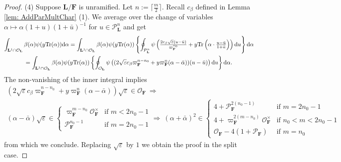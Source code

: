 \documentclass[A4]{amsart}
\numberwithin{equation}{section} \everymath{\displaystyle}
\newcommand{\Tr}{{\rm Tr}}
\newcommand{\ud}{\mathrm{d}}
\newcommand{\F}{\mathbf{F}}
\newcommand{\bL}{\mathbf{L}}
\newcommand{\vO}{\mathcal{O}}
\newcommand{\vP}{\mathcal{P}}
\begin{document}
\begin{proof}
\noindent (4) Suppose $\bL/\F$ is unramified. Let $n := \lceil \tfrac{m}{2} \rceil$. Recall $c_{\beta}$ defined in Lemma \ref{lem: AddParMultChar} (1). We average over the change of variables $\alpha \mapsto \alpha (1+u)(1+\bar{u})^{-1}$ for $u \in \vP_{\bL}^n$ and get
\begin{multline*} 
	\int_{\bL^1 \cap \vO_{\bL}} \beta(\alpha) \psi(y \Tr(\alpha)) \ud \alpha = \int_{\bL^1 \cap \vO_{\bL}} \beta(\alpha) \psi(y \Tr(\alpha)) \left\{ \oint_{\vP_{\bL}^n} \psi \left( \tfrac{2 c_{\beta} \sqrt{\varepsilon} (u-\bar{u})}{\varpi_{\F}^{n_0}} +y \Tr \left( \alpha \cdot \tfrac{u-\bar{u}}{1+\bar{u}} \right) \right) \ud u \right\} \ud \alpha \\
	= \int_{\bL^1 \cap \vO_{\bL}} \beta(\alpha) \psi(y \Tr(\alpha)) \left\{ \oint_{\vO_{\bL}} \psi \left( (2 \sqrt{\varepsilon} c_{\beta} \varpi_{\F}^{n-n_0} + y \varpi_{\F}^n (\alpha - \bar{\alpha}))(u-\bar{u}) \right) \ud u \right\} \ud \alpha.
\end{multline*}
	The non-vanishing of the inner integral implies
\begin{multline*} 
	\left( 2 \sqrt{\varepsilon} c_{\beta} \varpi_{\F}^{n-n_0} + y \varpi_{\F}^n (\alpha - \bar{\alpha}) \right) \sqrt{\varepsilon} \in \vO_{\F} \ \Rightarrow \\
	(\alpha - \bar{\alpha}) \sqrt{\varepsilon} \in 
	\begin{cases} 
		\varpi_{\F}^{m-n_0} \vO_{\F}^{\times} & \text{if } m < 2n_0-1 \\
		\vP_{\F}^{n_0-1} & \text{if } m = 2n_0-1
	\end{cases}
	\Rightarrow \ (\alpha + \bar{\alpha})^2 \in 
	\begin{cases} 
	4 + \vP_{\F}^{2(n_0-1)} & \text{if } m=2n_0-1 \\
	4 + \varpi_{\F}^{2(m-n_0)} \vO_{\F}^{\times} & \text{if } n_0<m<2n_0-1 \\
	\vO_{\F} - 4(1+\vP_{\F}) & \text{if } m=n_0
	\end{cases}
\end{multline*}
	from which we conclude. Replacing $\sqrt{\varepsilon}$ by $1$ we obtain the proof in the split case.
	

\end{proof}
\end{document}
